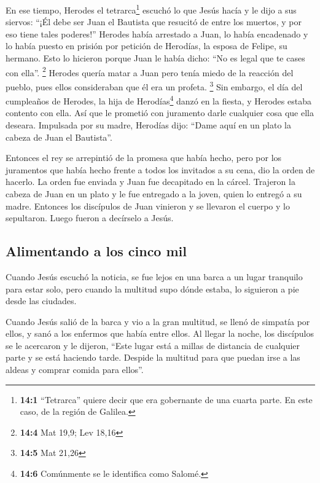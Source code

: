 En ese tiempo, Herodes el tetrarca\footnote{\textbf{14:1}
  ``Tetrarca'' quiere decir que era gobernante de una cuarta parte. En
  este caso, de la región de Galilea.} escuchó lo que Jesús hacía
 y le dijo a sus siervos: ``¡Él debe ser Juan el Bautista
que resucitó de entre los muertos, y por eso tiene tales poderes!''
 Herodes había arrestado a Juan, lo había encadenado y lo
había puesto en prisión por petición de Herodías, la esposa de Felipe,
su hermano.  Esto lo hicieron porque Juan le había dicho:
``No es legal que te cases con ella''. \footnote{\textbf{14:4} Mat 19,9;
  Lev 18,16}  Herodes quería matar a Juan pero tenía miedo
de la reacción del pueblo, pues ellos consideraban que él era un
profeta. \footnote{\textbf{14:5} Mat 21,26}  Sin embargo,
el día del cumpleaños de Herodes, la hija de Herodías\footnote{\textbf{14:6}
  Comúnmente se le identifica como Salomé.} danzó en la fiesta, y
Herodes estaba contento con ella.  Así que le prometió con
juramento darle cualquier cosa que ella deseara. 
Impulsada por su madre, Herodías dijo: ``Dame aquí en un plato la cabeza
de Juan el Bautista''.

 Entonces el rey se arrepintió de la promesa que había
hecho, pero por los juramentos que había hecho frente a todos los
invitados a su cena, dio la orden de hacerlo.  La orden
fue enviada y Juan fue decapitado en la cárcel.  Trajeron
la cabeza de Juan en un plato y le fue entregado a la joven, quien lo
entregó a su madre.  Entonces los discípulos de Juan
vinieron y se llevaron el cuerpo y lo sepultaron. Luego fueron a
decírselo a Jesús.

\hypertarget{alimentando-a-los-cinco-mil}{%
\subsection{Alimentando a los cinco
mil}\label{alimentando-a-los-cinco-mil}}

 Cuando Jesús escuchó la noticia, se fue lejos en una
barca a un lugar tranquilo para estar solo, pero cuando la multitud supo
dónde estaba, lo siguieron a pie desde las ciudades.

 Cuando Jesús salió de la barca y vio a la gran multitud,
se llenó de simpatía por ellos, y sanó a los enfermos que había entre
ellos.  Al llegar la noche, los discípulos se le
acercaron y le dijeron, ``Este lugar está a millas de distancia de
cualquier parte y se está haciendo tarde. Despide la multitud para que
puedan irse a las aldeas y comprar comida para ellos''.

